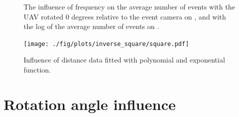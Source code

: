 \begin{figure}[htbp]
	\centering
	\caption{
  The influence of frequency on the average number of events with the UAV rotated 0 degrees relative to the event camera on , and with the log of the average number of events on .
  }
	\label{fig:freqs}
\end{figure}

\begin{figure}[htbp]
	\centering
	\texttt{[image: ./fig/plots/inverse\_square/square.pdf]}
	\caption{Influence of distance data fitted with polynomial and exponential function.}
	\label{fig:fit1}
\end{figure}

\newpage

\section{Rotation angle influence}

